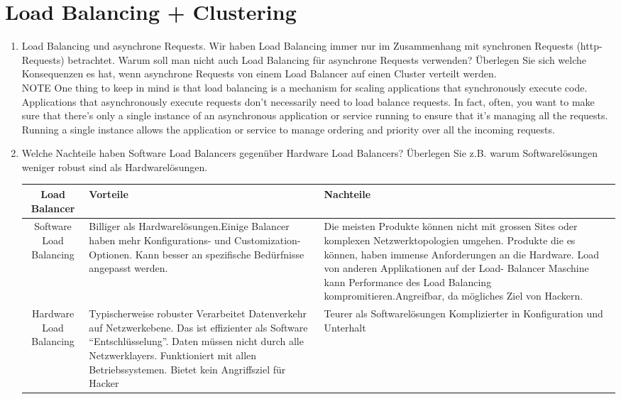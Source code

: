 \documentclass[a4paper,10pt]{scrreprt}
\begin{document}
\chapter{Load Balancing + Clustering} %
\label{cha:load_balancing}
\begin{enumerate}
	\item Load Balancing und asynchrone Requests.
Wir haben Load Balancing immer nur im Zusammenhang mit synchronen Requests (http-Requests)
betrachtet. Warum soll man nicht auch Load Balancing für asynchrone Requests verwenden?
Überlegen Sie sich welche Konsequenzen es hat, wenn asynchrone Requests von einem Load
Balancer auf einen Cluster verteilt werden. \\

NOTE One thing to keep in mind is that load balancing is a mechanism for scaling applications
that synchronously execute code. Applications that asynchronously execute requests don’t
necessarily need to load balance requests. In fact, often, you want to make sure that there’s only
a single instance of an asynchronous application or service running to ensure that it’s managing
all the requests. Running a single instance allows the application or service to manage ordering
and priority over all the incoming requests.


\item Welche Nachteile haben Software Load Balancers gegenüber Hardware Load Balancers?
Überlegen Sie z.B. warum Softwarelösungen weniger robust sind als Hardwarelösungen.

\begin{tabular}{|c|p{5cm}|p{5cm}|}
\hline
Load Balancer & Vorteile & Nachteile \\ \hline
Software Load Balancing & Billiger als Hardwarelösungen.Einige Balancer haben mehr
Konfigurations- und
Customization-Optionen. Kann
besser an spezifische
Bedürfnisse angepasst
werden. & Die meisten Produkte
können nicht mit grossen
Sites oder komplexen
Netzwerktopologien
umgehen. Produkte die es können,
haben immense
Anforderungen an die
Hardware. Load von anderen
Applikationen auf der Load-
Balancer Maschine kann
Performance des Load
Balancing kompromitieren.Angreifbar, da mögliches
Ziel von Hackern. \\ \hline
Hardware Load Balancing & Typischerweise robuster
Verarbeitet Datenverkehr auf
Netzwerkebene. Das ist
effizienter als Software
“Entschlüsselung”. Daten
müssen nicht durch alle
Netzwerklayers.
Funktioniert mit allen
Betriebssystemen.
Bietet kein Angriffsziel für
Hacker & Teurer als
Softwarelösungen
 Komplizierter in
Konfiguration und Unterhalt \\ \hline
\end{tabular}


\end{enumerate}
\end{document}
